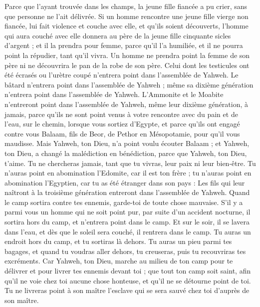 \begin{multicols}{2}
Parce que l'ayant trouvée dans les champs, la jeune fille fiancée a pu crier, sans que personne ne l'ait délivrée.
Si un homme rencontre une jeune fille vierge non fiancée, lui fait violence et couche avec elle, et qu'ils soient découverts,
l'homme qui aura couché avec elle donnera au père de la jeune fille cinquante sicles d'argent ; et il la prendra pour femme, parce qu'il l'a humiliée, et il ne pourra point la répudier, tant qu'il vivra.
Un homme ne prendra point la femme de son père ni ne découvrira le pan de la robe de son père.
\VerseOne{}Celui dont les testicules ont été écrasés ou l'urètre coupé n'entrera point dans l'assemblée de Yahweh.
Le bâtard n'entrera point dans l'assemblée de Yahweh ; même sa dixième génération n'entrera point dans l'assemblée de Yahweh.
L'Ammonite et le Moabite n'entreront point dans l'assemblée de Yahweh, même leur dixième génération, à jamais,
parce qu'ils ne sont point venus à votre rencontre avec du pain et de l'eau, sur le chemin, lorsque vous sortiez d'Egypte, et parce qu'ils ont engagé contre vous Balaam, fils de Beor, de Pethor en Mésopotamie, pour qu'il vous maudisse.
Mais Yahweh, ton Dieu, n'a point voulu écouter Balaam ; et Yahweh, ton Dieu, a changé la malédiction en bénédiction, parce que Yahweh, ton Dieu, t'aime.
Tu ne chercheras jamais, tant que tu vivras, leur paix ni leur bien-être.
Tu n'auras point en abomination l'Edomite, car il est ton frère ; tu n'auras point en abomination l'Egyptien, car tu as été étranger dans son pays :
Les fils qui leur naîtront à la troisième génération entreront dans l'assemblée de Yahweh.
Quand le camp sortira contre tes ennemis, garde-toi de toute chose mauvaise.
S'il y a parmi vous un homme qui ne soit point pur, par suite d'un accident nocturne, il sortira hors du camp, et n'entrera point dans le camp.
Et sur le soir, il se lavera dans l'eau, et dès que le soleil sera couché, il rentrera dans le camp.
Tu auras un endroit hors du camp, et tu sortiras là dehors.
Tu auras un pieu parmi tes bagages, et quand tu voudras aller dehors, tu creuseras, puis tu recouvriras tes excréments.
Car Yahweh, ton Dieu, marche au milieu de ton camp pour te délivrer et pour livrer tes ennemis devant toi ; que tout ton camp soit saint, afin qu'il ne voie chez toi aucune chose honteuse, et qu'il ne se détourne point de toi.
Tu ne livreras point à son maître l'esclave qui se sera sauvé chez toi d'auprès de son maître.

\end{multicols}
